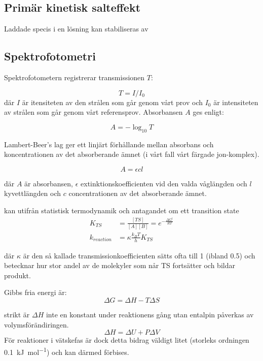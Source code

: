\subsection{Primär kinetisk salteffekt}



Laddade specis i en lösning kan stabiliseras av  


\subsection{Spektrofotometri}
Spektrofotometern registrerar transmissionen $T$:

\begin{equation}
  T = I/I_0
\end{equation}
där $I$ är itensiteten av den strålen som går genom vårt prov
och $I_0$ är intensiteten av strålen som går genom vårt referensprov.
Absorbansen $A$ ges enligt:

\begin{equation}
  \label{eq:absorbance}
  A = -\log_{10}T
\end{equation}

Lambert-Beer's lag ger ett linjärt förhållande mellan absorbans och
koncentrationen av det absorberande ämnet (i vårt fall vårt färgade jon-komplex). 

\begin{equation}
  \label{eq:lambert-beer}
  A = \epsilon c l
\end{equation}

där $A$ är absorbansen, $\epsilon$ extinktionskoefficienten vid den valda
våglängden och $l$ kyvettlängden och $c$ concentrationen av det
absorberande ämnet. 




kan utifrån
statistisk termodynamik och antagandet om ett transition state
\begin{align}
  \label{eq:K_TS}
  K_{TS} &=\frac{[TS]}{[A][B]}=e^{-\frac{\Delta G^{\ddag}}{RT}} \\
  \label{eq:k_tst}
  k_{reaction} &=\kappa\frac{k_{B}T}{h}K_{TS}
\end{align}

där $\kappa$ är den så kallade transmissionkoefficienten sätts ofta till
1 (ibland 0.5) och betecknar hur stor andel av de molekyler som når TS
fortsätter och bildar produkt.

Gibbs fria energi är:
\begin{equation}
  \label{eq:gibbs}
  \Delta G = \Delta H - T\Delta S
\end{equation}

strikt är $\Delta H$ inte en konstant under reaktionens gång utan
entalpin påverkas av volymsförändiringen.
\begin{equation}
  \label{eq:enthalpy}
  \Delta H = \Delta U + P\Delta V
\end{equation}
För reaktioner i vätskefas är dock detta bidrag väldigt litet (storleks
ordningen \SI{0.1}{\kilo\joule\per\mole}) och kan därmed förbises.
